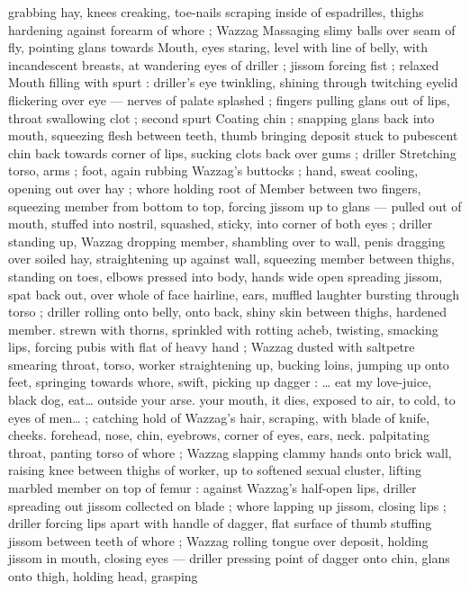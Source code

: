 grabbing hay, knees creaking, toe-nails scraping inside of 
espadrilles, thighs hardening against forearm of whore ; Wazzag 
Massaging slimy balls over seam of fly, pointing glans towards 
Mouth, eyes staring, level with line of belly, with incandescent 
breasts, at wandering eyes of driller ; jissom forcing fist ; relaxed 
Mouth filling with spurt : driller's eye twinkling, shining through 
twitching eyelid flickering over eye --- nerves of palate splashed ; 
fingers pulling glans out of lips, throat swallowing clot ; second spurt 
Coating chin ; snapping glans back into mouth, squeezing flesh 
between teeth, thumb bringing deposit stuck to pubescent chin back 
towards corner of lips, sucking clots back over gums ; driller 
Stretching torso, arms ; foot, again rubbing Wazzag's buttocks ; 
hand, sweat cooling, opening out over hay ; whore holding root of 
Member between two fingers, squeezing member from bottom to top, 
forcing jissom up to glans --- pulled out of mouth, stuffed into 
nostril, squashed, sticky, into corner of both eyes ; driller standing 
up, Wazzag dropping member, shambling over to wall, penis dragging 
over soiled hay, straightening up against wall, squeezing member 
between thighs, standing on toes, elbows pressed into body, hands 
wide open spreading jissom, spat back out, over whole of face 
hairline, ears, muffled laughter bursting through torso ; driller rolling 
onto belly, onto back, shiny skin between thighs, hardened member. 
strewn with thorns, sprinkled with rotting acheb, twisting, smacking 
lips, forcing pubis with flat of heavy hand ; Wazzag dusted with 
saltpetre smearing throat, torso, worker straightening up, bucking 
loins, jumping up onto feet, springing towards whore, swift, picking 
up dagger : {\gl}{\ldots} eat my love-juice, black dog, eat{\ldots} outside your arse. 
your mouth, it dies, exposed to air, to cold, to eyes of men{\ldots}{\gr} ; 
catching hold of Wazzag's hair, scraping, with blade of knife, cheeks. 
forehead, nose, chin, eyebrows, corner of eyes, ears, neck. 
palpitating throat, panting torso of whore ; Wazzag slapping clammy 
hands onto brick wall, raising knee between thighs of worker, up to 
softened sexual cluster, lifting marbled member on top of femur : 
against Wazzag's half-open lips, driller spreading out jissom 
collected on blade ; whore lapping up jissom, closing lips ; driller 
forcing lips apart with handle of dagger, flat surface of thumb 
stuffing jissom between teeth of whore ; Wazzag rolling tongue over 
deposit, holding jissom in mouth, closing eyes --- driller pressing 
point of dagger onto chin, glans onto thigh, holding head, grasping 
